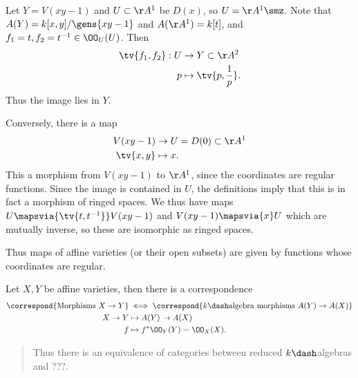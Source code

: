 \begin{example}

Let \(Y = V(xy-1)\) and \(U\subset \AA^1\) be \(D(x)\), so
\(U = \AA^1\smz\). Note that \(A(Y) = k[x,y]/\gens{xy-1}\) and
\(A(\AA^1) = k[t]\), and \(f_1=t, f_2=t^{-1} \in \OO_U(U)\). Then
\begin{align*}  
\tv{f_1, f_2}: U &\to Y\subset  \AA^2 \\
p &\mapsto \tv{p, {1\over p} }
.\end{align*} Thus the image lies in \(Y\).

Conversely, there is a map
\begin{align*}  
V(xy - 1) &\to U = D(0) \subset  \AA^1 \\
\tv{x, y} &\mapsto x
.\end{align*} This a morphism from \(V(xy - 1)\) to \(\AA^1\), since the
coordinates are regular functions. Since the image is contained in
\(U\), the definitions imply that this is in fact a morphism of ringed
spaces. We thus have maps \(U\mapsvia{\tv{t, t^{-1} }} V(xy-1)\) and
\(V(xy-1) \mapsvia{x} U\) which are mutually inverse, so these are
isomorphic as ringed spaces.

\end{example}

Thus maps of affine varieties (or their open subsets) are given by
functions whose coordinates are regular.

\begin{corollary}

Let \(X, Y\) be affine varieties, then there is a correspondence
\begin{align*}  
\correspond{\text{Morphisms } X\to Y }
&\iff
\correspond{k\dash\text{algebra morphisms } A(Y) \to A(X)} \\
X\to Y &\mapsto A(Y) \to A(X) \\
f &\mapsto f^* \OO_Y(Y) = \OO_X(X)
.\end{align*}

\begin{quote}
Thus there is an equivalence of categories between reduced
\(k\dash\)algebras and ???.
\end{quote}

\end{corollary}

